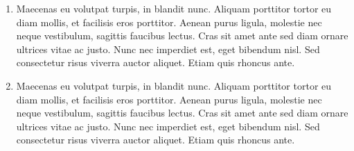 \begin{enumerate}
    \item Maecenas eu volutpat turpis, in blandit nunc. Aliquam porttitor tortor eu diam mollis, et facilisis eros porttitor. Aenean purus ligula, molestie nec neque vestibulum, sagittis faucibus lectus. Cras sit amet ante sed diam ornare ultrices vitae ac justo. Nunc nec imperdiet est, eget bibendum nisl. Sed consectetur risus viverra auctor aliquet. Etiam quis rhoncus ante. 
    \item Maecenas eu volutpat turpis, in blandit nunc. Aliquam porttitor tortor eu diam mollis, et facilisis eros porttitor. Aenean purus ligula, molestie nec neque vestibulum, sagittis faucibus lectus. Cras sit amet ante sed diam ornare ultrices vitae ac justo. Nunc nec imperdiet est, eget bibendum nisl. Sed consectetur risus viverra auctor aliquet. Etiam quis rhoncus ante. 
\end{enumerate}